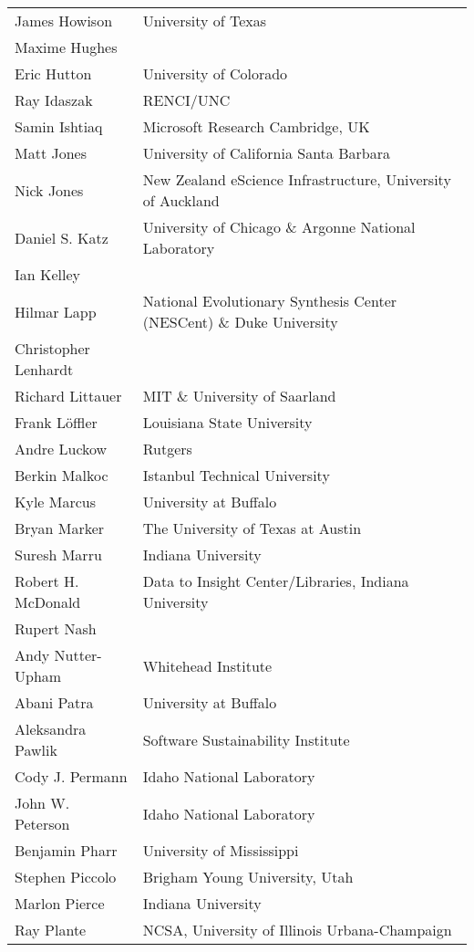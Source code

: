 \documentclass[11pt, oneside]{amsart}
\begin{document}
{\begin{longtable}{ll}
\\ James Howison         &  University of Texas
\\ Maxime Hughes
\\ Eric Hutton           &  University of Colorado
\\ Ray Idaszak           &  RENCI/UNC
\\ Samin Ishtiaq         &  Microsoft Research Cambridge, UK
\\ Matt Jones            &  University of California Santa Barbara
\\ Nick Jones            &  New Zealand eScience Infrastructure, University of Auckland
\\ Daniel S. Katz        &  University of Chicago \& Argonne National Laboratory
\\ Ian Kelley
\\ Hilmar Lapp           &  National Evolutionary Synthesis Center (NESCent) \& Duke University
\\ Christopher Lenhardt
\\ Richard Littauer      &  MIT \& University of Saarland
\\ Frank L\"{o}ffler     &  Louisiana State University
\\ Andre Luckow          &  Rutgers
\\ Berkin Malkoc         &  Istanbul Technical University
\\ Kyle Marcus           &  University at Buffalo
\\ Bryan Marker          &  The University of Texas at Austin
\\ Suresh Marru          &  Indiana University
\\ Robert H. McDonald    &  Data to Insight Center/Libraries, Indiana University
\\ Rupert Nash
\\ Andy Nutter-Upham     &  Whitehead Institute
\\ Abani Patra           &  University at Buffalo
\\ Aleksandra Pawlik     &  Software Sustainability Institute
\\ Cody J. Permann       &  Idaho National Laboratory
\\ John W. Peterson      &  Idaho National Laboratory
\\ Benjamin Pharr        &  University of Mississippi
\\ Stephen Piccolo       &  Brigham Young University, Utah
\\ Marlon Pierce         &  Indiana University
\\ Ray Plante            &  NCSA, University of Illinois Urbana-Champaign

\end{longtable}}
\end{document}

